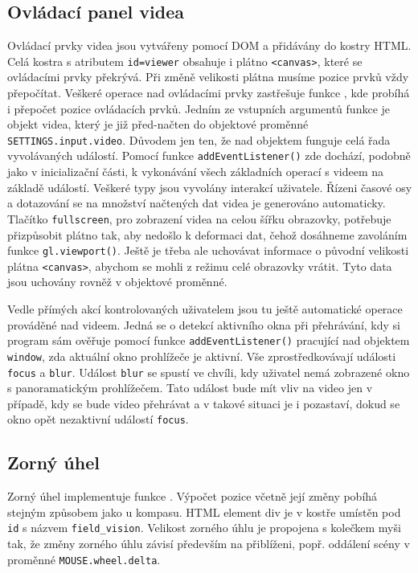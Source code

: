  


\subsection{Ovládací panel videa}
Ovládací prvky videa jsou vytvářeny pomocí DOM a přidávány do kostry HTML. Celá kostra s atributem \texttt{id=viewer} obsahuje i plátno \texttt{<canvas>}, které se ovládacími prvky překrývá. Při změně velikosti plátna musíme pozice prvků vždy přepočítat. Veškeré operace nad ovládacími prvky zastřešuje funkce \texttt{\createVideoControlls}, kde probíhá i přepočet pozice ovládacích prvků. Jedním ze vstupních argumentů funkce je objekt videa, který je již před-načten do objektové proměnné \texttt{SETTINGS.input.video}. Důvodem jen ten, že  nad objektem funguje celá řada vyvolávaných událostí. Pomocí funkce \texttt{addEventListener()} zde dochází, podobně jako v inicializační části, k vykonávání všech základních operací s videem na základě událostí. Veškeré typy jsou vyvolány interakcí uživatele. Řízeni časové osy a dotazování se na množství načtených dat videa je generováno automaticky. Tlačítko \texttt{fullscreen}, pro zobrazení videa na celou šířku obrazovky, potřebuje přizpůsobit plátno tak, aby nedošlo k deformaci dat, čehož dosáhneme zavoláním funkce \texttt{gl.viewport()}. Ještě je třeba ale uchovávat informace o původní velikosti plátna \texttt{<canvas>}, abychom se mohli z režimu celé obrazovky vrátit. Tyto data jsou uchovány rovněž v objektové proměnné.

Vedle přímých akcí kontrolovaných uživatelem jsou tu ještě  automatické operace prováděné nad videem. Jedná se o detekcí aktivního okna při přehrávání, kdy si program sám ověřuje pomocí funkce \texttt{addEventListener()}  pracující nad objektem \texttt{window}, zda aktuální okno prohlížeče je aktivní. Vše zprostředkovávají události   \texttt{focus} a \texttt{blur}. Událost  \texttt{blur} se spustí ve chvíli, kdy uživatel nemá zobrazené okno s panoramatickým prohlížečem. Tato událost bude mít vliv na video jen v případě, kdy se bude video přehrávat a v takové situaci je i pozastaví, dokud se okno opět nezaktivní událostí \texttt{focus}.

\newpage

\subsection{Zorný úhel}
Zorný úhel implementuje funkce \texttt{\createFieldVision}. Výpočet pozice včetně její změny pobíhá stejným způsobem jako u kompasu. HTML element div je v kostře umístěn pod \texttt{id} s názvem  \texttt{field\_vision}. Velikost zorného úhlu je propojena s kolečkem myši tak, že změny zorného úhlu závisí především na přiblíženi, popř. oddálení scény v proměnné \texttt{MOUSE.wheel.delta}. 


